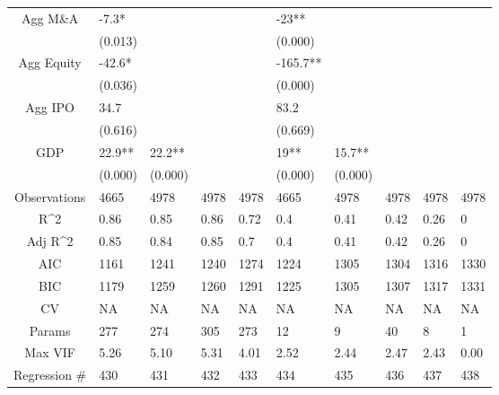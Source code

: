 \documentclass{article}
\begin{document}
\begin{table}[H]
\begin{tabular}{|clllllllll|}
  Agg M\&A & -7.3* &  &  &  & -23** &  &  &  &  \\ 
   & (0.013) &  &  &  & (0.000) &  &  &  &  \\ 
  Agg Equity & -42.6* &  &  &  & -165.7** &  &  &  &  \\ 
   & (0.036) &  &  &  & (0.000) &  &  &  &  \\ 
  Agg IPO & 34.7 &  &  &  & 83.2 &  &  &  &  \\ 
   & (0.616) &  &  &  & (0.669) &  &  &  &  \\ 
  GDP & 22.9** & 22.2** &  &  & 19** & 15.7** &  &  &  \\ 
   & (0.000) & (0.000) &  &  & (0.000) & (0.000) &  &  &  \\ 
  \hline 
 Observations & 4665 & 4978 & 4978 & 4978 & 4665 & 4978 & 4978 & 4978 & 4978 \\ 
  R^2 & 0.86 & 0.85 & 0.86 & 0.72 & 0.4 & 0.41 & 0.42 & 0.26 & 0 \\ 
  Adj R^2 & 0.85 & 0.84 & 0.85 & 0.7 & 0.4 & 0.41 & 0.42 & 0.26 & 0 \\ 
  AIC & 1161 & 1241 & 1240 & 1274 & 1224 & 1305 & 1304 & 1316 & 1330 \\ 
  BIC & 1179 & 1259 & 1260 & 1291 & 1225 & 1305 & 1307 & 1317 & 1331 \\ 
  CV & NA & NA & NA & NA & NA & NA & NA & NA & NA \\ 
  Params & 277 & 274 & 305 & 273 & 12 & 9 & 40 & 8 & 1 \\ 
  Max VIF & 5.26 & 5.10 & 5.31 & 4.01 & 2.52 & 2.44 & 2.47 & 2.43 & 0.00 \\ 
  Regression \# & 430 & 431 & 432 & 433 & 434 & 435 & 436 & 437 & 438 \\ 
   \hline
\end{tabular}
 
\end{table}
\end{document}
